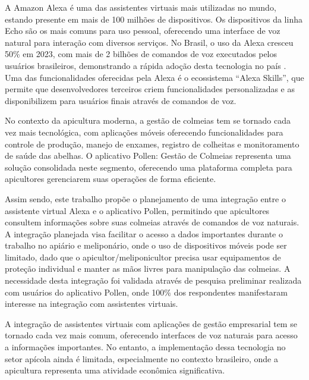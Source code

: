 \label{cap:introducao}

A Amazon Alexa é uma das assistentes virtuais mais utilizadas no mundo, estando presente em mais de 100 milhões de dispositivos. 
Os dispositivos da linha Echo são os mais comuns para uso pessoal, oferecendo uma interface de voz natural para interação com diversos serviços. 
No Brasil, o uso da Alexa cresceu 50\% em 2023, com mais de 2 bilhões de comandos de voz executados pelos usuários brasileiros, 
demonstrando a rápida adoção desta tecnologia no país \cite{forbes2024}. Uma das funcionalidades oferecidas pela Alexa é o ecossistema ``Alexa Skills'', 
que permite que desenvolvedores terceiros criem funcionalidades personalizadas e as disponibilizem para usuários finais através de comandos de voz.

No contexto da apicultura moderna, a gestão de colmeias tem se tornado cada vez mais tecnológica, com aplicações móveis oferecendo funcionalidades 
para controle de produção, manejo de enxames, registro de colheitas e monitoramento de saúde das abelhas. 
O aplicativo Pollen: Gestão de Colmeias representa uma solução consolidada neste segmento, oferecendo uma plataforma completa para apicultores 
gerenciarem suas operações de forma eficiente.

Assim sendo, este trabalho propõe o planejamento de uma integração entre o assistente virtual Alexa e o aplicativo Pollen, 
permitindo que apicultores consultem informações sobre suas colmeias através de comandos de voz naturais. 
A integração planejada visa facilitar o acesso a dados importantes durante o trabalho no apiário e meliponário, onde o uso de dispositivos móveis pode ser limitado, dado que o apicultor/meliponicultor precisa usar equipamentos de proteção individual e manter as mãos livres para manipulação das colmeias.
A necessidade desta integração foi validada através de pesquisa preliminar realizada com usuários do aplicativo Pollen, onde 100\% dos respondentes manifestaram interesse na integração com assistentes virtuais.


\label{sec:problema-pesquisa-justificativa}

A integração de assistentes virtuais com aplicações de gestão empresarial tem se tornado cada vez mais comum, 
oferecendo interfaces de voz naturais para acesso a informações importantes. No entanto, a implementação dessa tecnologia no setor apícola 
ainda é limitada, especialmente no contexto brasileiro, onde a apicultura representa uma atividade econômica significativa.

